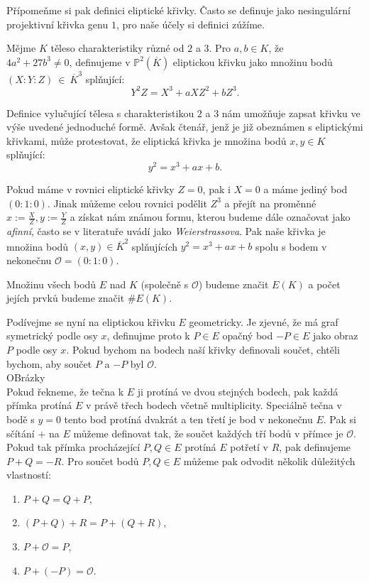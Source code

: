 \documentclass [12pt]{report}
\begin{document}
Přípomeňme si pak definici eliptické křivky. Často se definuje jako nesingulární projektivní křivka genu $1$, pro naše účely si definici zúžíme.
\begin{definice}
Mějme $K$ těleso charakteristiky různé od $2$ a $3$. Pro $a,b \in K$, že\\ $4a^2+27b^3 \neq 0$, definujeme v $\mathbb{P}^2 (\overline{K})$ eliptickou křivku jako množinu bodů $(X:Y:Z)~\in~\overline{K}^3$ splňující:
\begin{equation*}
Y^2 Z = X^3 + a X Z^2 + b Z^3. 
\end{equation*}
\end{definice}

Definice vylučující tělesa s charakteristikou $2$ a $3$ nám umožňuje zapsat křivku ve výše uvedené jednoduché formě. Avšak čtenář, jenž je již obeznámen s eliptickými křivkami, může protestovat, že eliptická křivka je množina bodů $x,y \in K$ splňující:
\begin{equation*}
y^2 = x^3 + a x + b.
\end{equation*}

Pokud máme v rovnici eliptické křivky $Z=0$, pak i $X = 0$ a máme jediný bod $(0:1:0)$. Jinak můžeme celou rovnici podělit $Z^3$ a přejít na proměnné $x := \frac{X}{Z}, y := \frac{Y}{Z}$ a získat nám známou formu, kterou budeme dále označovat jako \textit{afinní}, často se v literatuře uvádí jako \textit{Weierstrassova}. Pak naše křivka je množina bodů $(x,y) \in \overline{K}^2$ splňujících $y^2 = x^3 + a x + b$ spolu s bodem v nekonečnu $\mathcal{O} = (0:1:0)$.
\begin{definice}
 Množinu všech bodů $E$ nad $K$ (společně s $\mathcal{O}$) budeme značit $E(K)$ a počet jejích prvků budeme značit $\# E(K)$.
\end{definice}


Podívejme se nyní na eliptickou křivku $E$ geometricky. Je zjevné, že má graf symetrický podle osy $x$, definujme proto k $P \in E$ opačný bod $-P \in E$ jako obraz $P$ podle osy $x$. Pokud bychom na bodech naší křivky definovali součet, chtěli bychom, aby součet $P$ a $-P$ byl $\mathcal{O}$.\\

OBrázky\\

Pokud řekneme, že tečna k $E$ ji protíná ve dvou stejných bodech, pak každá přímka protíná $E$ v právě třech bodech včetně multiplicity. Speciálně tečna v bodě s $y=0$ tento bod protíná dvakrát a ten třetí je bod v nekonečnu $E$. Pak si sčítání $+$ na $E$ můžeme definovat tak, že součet každých tří bodů v přímce je $\mathcal{O}$. Pokud tak přímka procházející $P,Q \in E$ protíná $E$ potřetí v $R$, pak definujeme $P+ Q = -R$. Pro součet bodů $P,Q \in E$ můžeme pak odvodit několik důležitých vlastností:
\begin{enumerate}
\item $P + Q = Q + P$,
\item $(P + Q) + R =P + ( Q + R)$,
\item $P + \mathcal{O} = P$,
\item $P + (-P) = \mathcal{O}$.
\end{enumerate} 
\end{document}

